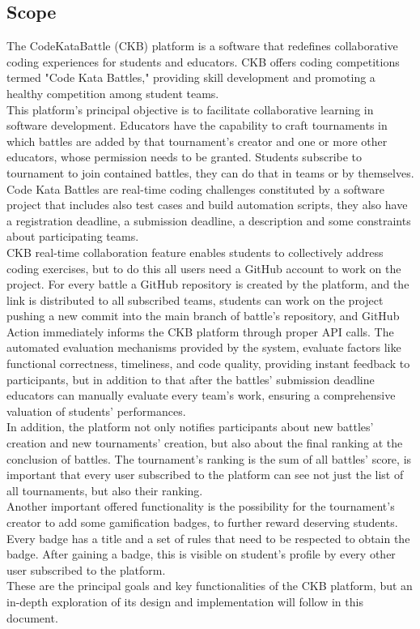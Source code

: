\subsection{Scope}
The CodeKataBattle (CKB) platform is a software that redefines collaborative coding experiences for students and educators. CKB offers coding competitions termed "Code Kata Battles," providing skill development and promoting a healthy competition among student teams. \\
This platform's principal objective is to facilitate collaborative learning in software development. Educators have the capability to craft tournaments in which battles are added by that tournament's creator and one or more other educators, whose permission needs to be granted. Students subscribe to tournament to join contained battles, they can do that in teams or by themselves. Code Kata Battles are real-time coding challenges constituted by a software project that includes also test cases and build automation scripts, they also have a registration deadline, a submission deadline, a description and some constraints about participating teams. \\
CKB real-time collaboration feature enables students to collectively address coding exercises, but to do this all users need a GitHub account to work on the project. For every battle a GitHub repository is created by the platform, and the link is distributed to all subscribed teams, students can work on the project pushing a new commit into the main branch of battle’s repository, and GitHub Action immediately informs the CKB platform through proper API calls. The automated evaluation mechanisms provided by the system, evaluate factors like functional correctness, timeliness, and code quality, providing instant feedback to participants, but in addition to that after the battles’ submission deadline educators can manually evaluate every team’s work, ensuring a comprehensive valuation of students' performances. \\
In addition, the platform not only notifies participants about new battles’ creation and new tournaments’ creation, but also about the final ranking at the conclusion of battles.
The tournament's ranking is the sum of all battles' score, is important that every user subscribed to the platform can see not just the list of all tournaments, but also their ranking. \\
Another important offered functionality is the possibility for the tournament's creator to add some gamification badges, to further reward deserving students. Every badge has a title and a set of rules that need to be respected to obtain the badge. After gaining a badge, this is visible on student's profile by every other user subscribed to the platform. \\
These are the principal goals and key functionalities of the CKB platform, but an in-depth exploration of its design and implementation will follow in this document.


